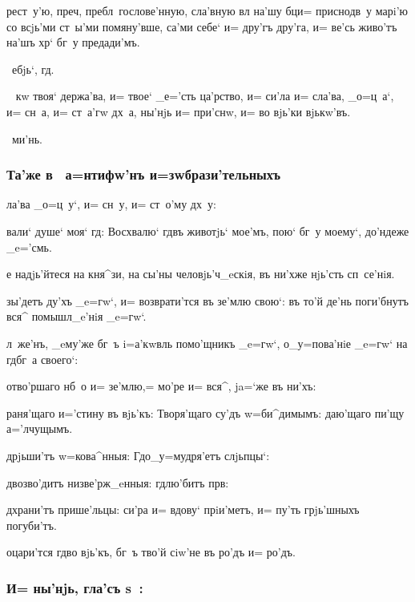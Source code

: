 \documentclass[12pt,twoside,a6paper,xdvi,civil=antiqua]{hipbook}
\newcommand{\xpref}[1]{\rem{#1:}\ }
\newcommand{\lik}{\rem{Ли'къ:}\ }
\renewcommand{\*}{~~\raise3pt\hbox{\footnotesize*}}
\begin{document}
{{рест~у'ю, преч, пребл~гослове'нную, сла'вную вл
на'шу бц и= приснодв~у марi'ю со всjь'ми ст~ы'ми помяну'вше, са'ми
себе` и= дру'гъ дру'га, и= ве'сь живо'тъ на'шъ хр` бг~у
предади'мъ.

\lik{ебjь`, гд.}

\xpref{\bukv{В}о'згласъ} кw твоя` держа'ва, и= твое`
_е='сть ца'рство, и= си'ла и= сла'ва, _о=ц~а`, и= сн~а, и= ст~а'гw
дх~а, ны'нjь и= при'снw, и= во вjь'ки вjькw'въ.

\lik{ми'нь.}

\subsubsection{Та'же в~ а=нтифw'нъ и=зwбрази'тельныхъ}

ла'ва _о=ц~у`, и= сн~у, и= ст~о'му дх~у:

{\large{}вали` душе` моя` гд: Восхвалю` гд въ животjь`
  мое'мъ, пою` бг~у моему`, до'ндеже _e='смь.\par}

{\large{}е надjь'йтеся на кня^зи, на сы'ны человjь'ч_eскiя, въ
  ни'хже нjь'сть сп~се'нiя.\par}

{\large{}зы'детъ ду'хъ _e=гw`, и= возврати'тся въ зе'млю свою`:
  въ то'й де'нь поги'бнутъ вся^ помышл_e'нiя _e=гw`.\par}

л~же'нъ, _eму'же бг~ъ i=а'кwвль помо'щникъ _e=гw`,
о_у=пова'нiе _e=гw` на гд бг~а своего`:

отво'ршаго нб~о и= зе'млю,= мо'ре и= вся^, ja=`же въ ни'хъ:

раня'щаго и='стину въ вjь'къ: Творя'щаго су'дъ w=би^димымъ:
даю'щаго пи'щу а='л\-чу\-щымъ.

д рjьши'тъ w=кова^нныя: Гд о_у=\-му\-дря'\-етъ слjьпцы`:

д возво'дитъ низве'рж_eнныя: гд лю'битъ прв:

д храни'тъ прише'льцы: си'ра и= вдову` прiи'метъ, и= пу'ть грjь'шныхъ погуби'тъ.

{\large{}оцари'тся гд во вjь'къ, бг~ъ тво'й сiw'не въ ро'дъ
  и= ро'дъ.\par}

\subsubsection{И= ны'нjь, гла'съ s~:}

}}
\end{document}
